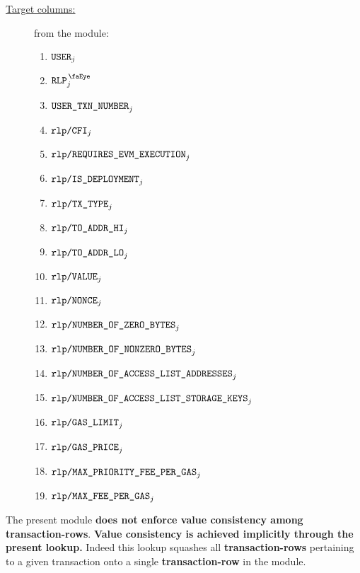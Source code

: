 \begin{description}
	\item[\underline{Target columns:}] from the \userTxnDataMod{} module: 
		\begin{multicols}{2}
			\begin{enumerate}
				\item $\texttt{USER}                                    _{j}$
				\item $\isUserTxnRlpView                        _{j}$
				\item $\texttt{USER}\texttt{\_}\texttt{TXN\_NUMBER}                   _{j}$
				\item $\texttt{rlp}\texttt{/}{\texttt{\texttt{CFI}}}                           _{j}$
				\item $\texttt{rlp}\texttt{/}{\texttt{\texttt{REQUIRES\_EVM\_EXECUTION}}}          _{j}$
				\item $\texttt{rlp}\texttt{/}{\texttt{IS\_DEPLOYMENT}}                         _{j}$
				\item $\texttt{rlp}\texttt{/}{\texttt{TX\_TYPE}}                        _{j}$
				\item $\texttt{rlp}\texttt{/}{\texttt{TO\_ADDR\_HI}}                      _{j}$
				\item $\texttt{rlp}\texttt{/}{\texttt{TO\_ADDR\_LO}}                      _{j}$
				\item $\texttt{rlp}\texttt{/}{\texttt{VALUE}}                         _{j}$
				\item $\texttt{rlp}\texttt{/}{\texttt{NONCE}}                         _{j}$
				\item $\texttt{rlp}\texttt{/}{\texttt{NUMBER\_OF\_ZERO\_BYTES}}             _{j}$
				\item $\texttt{rlp}\texttt{/}{\texttt{NUMBER\_OF\_NONZERO\_BYTES}}          _{j}$
				\item $\texttt{rlp}\texttt{/}{\texttt{NUMBER\_OF\_ACCESS\_LIST\_ADDRESSES}}   _{j}$
				\item $\texttt{rlp}\texttt{/}{\texttt{NUMBER\_OF\_ACCESS\_LIST\_STORAGE\_KEYS}} _{j}$
				\item $\texttt{rlp}\texttt{/}{\texttt{GAS\_LIMIT}}                      _{j}$
				\item $\texttt{rlp}\texttt{/}{\texttt{GAS\_PRICE}}                      _{j}$
				\item $\texttt{rlp}\texttt{/}{\texttt{MAX\_PRIORITY\_FEE\_PER\_GAS}}          _{j}$
				\item $\texttt{rlp}\texttt{/}{\texttt{MAX\_FEE\_PER\_GAS}}                  _{j}$
			\end{enumerate} 
		\end{multicols}
\end{description}
\saNote{}
The present module \textbf{does not enforce value consistency among transaction-rows}.
\textbf{Value consistency is achieved implicitly through the present lookup.}
Indeed this lookup squashes all \textbf{transaction-rows} pertaining to a given transaction
onto a single \textbf{transaction-row} in the \rlpTxnMod{} module.
